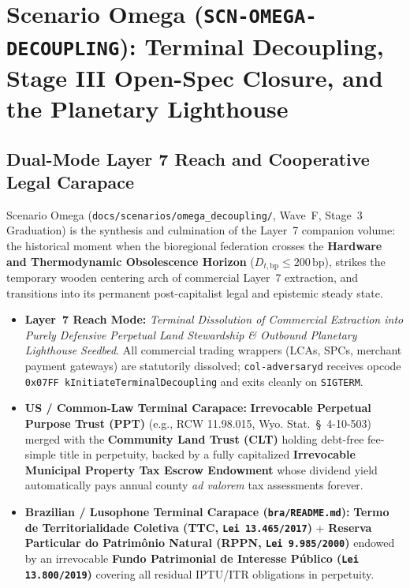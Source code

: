 \chapter{Scenario Omega (\texttt{SCN-OMEGA-DECOUPLING}): Terminal Decoupling, Stage III Open-Spec Closure, and the Planetary Lighthouse}
\label{app:scenario-omega}

\section{Dual-Mode Layer 7 Reach and Cooperative Legal Carapace}
Scenario Omega (\texttt{docs/scenarios/omega\_decoupling/}, Wave~F, Stage~3 Graduation) is the synthesis and culmination of the Layer~7 companion volume: the historical moment when the bioregional federation crosses the \textbf{Hardware and Thermodynamic Obsolescence Horizon} ($D_{t,\mathrm{bp}} \le 200\,\mathrm{bp}$), strikes the temporary wooden centering arch of commercial Layer~7 extraction, and transitions into its permanent post-capitalist legal and epistemic steady state.
\begin{itemize}
    \item \textbf{Layer~7 Reach Mode:} \textit{Terminal Dissolution of Commercial Extraction into Purely Defensive Perpetual Land Stewardship \& Outbound Planetary Lighthouse Seedbed}. All commercial trading wrappers (LCAs, SPCs, merchant payment gateways) are statutorily dissolved; \texttt{col-adversaryd} receives opcode \texttt{0x07FF kInitiateTerminalDecoupling} and exits cleanly on \texttt{SIGTERM}.
    \item \textbf{US / Common-Law Terminal Carapace:} \textbf{Irrevocable Perpetual Purpose Trust (PPT)} (e.g., RCW 11.98.015, Wyo. Stat.~\S~4-10-503) merged with the \textbf{Community Land Trust (CLT)} holding debt-free fee-simple title in perpetuity, backed by a fully capitalized \textbf{Irrevocable Municipal Property Tax Escrow Endowment} whose dividend yield automatically pays annual county \textit{ad valorem} tax assessments forever.
    \item \textbf{Brazilian / Lusophone Terminal Carapace (\texttt{bra/README.md}):} \textbf{Termo de Territorialidade Coletiva (TTC, \texttt{Lei 13.465/2017})} + \textbf{Reserva Particular do Patrim{\^o}nio Natural (RPPN, \texttt{Lei 9.985/2000})} endowed by an irrevocable \textbf{Fundo Patrimonial de Interesse P{\'u}blico (\texttt{Lei 13.800/2019})} covering all residual IPTU/ITR obligations in perpetuity.
\end{itemize}

